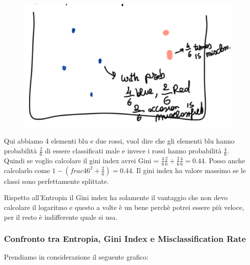 \documentclass[14pt]{extreport}
\begin{document}
\begin{figure}[H]
	\centering
	\includegraphics[width=0.7\linewidth]{589.jpeg}
\end{figure}

Qui abbiamo 4 elementi blu e due rossi, vuol dire che gli elementi blu hanno probabilità $\frac{2}{6}$ di essere classificati male e invece i rossi
hanno probabilità $\frac{4}{6}$. Quindi se voglio calcolare il gini index avrei Gini = $\frac{4}{6}\frac{2}{6} + \frac{2}{6}\frac{4}{6} = 0.44$. Posso
anche calcolarlo come $1-(frac{4}{6}^2 + \frac{2}{6}) = 0.44$. Il gini index ha valore massimo se le classi sono perfettamente splittate.

Rispetto all’Entropia il Gini index ha solamente il vantaggio che non devo calcolare il logaritmo e questo a volte è un bene perchè potrei essere più
veloce, per il resto è indifferente quale si usa.

\subsubsection{Confronto tra Entropia, Gini Index e Misclassification Rate}
Prendiamo in considerazione il seguente grafico:
\end{document}
